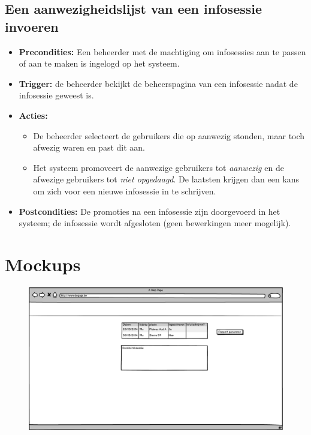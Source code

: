 \documentclass[11pt,a4paper,oneside]{article}
\begin{document}
\subsection{Een aanwezigheidslijst van een infosessie invoeren}
\begin{itemize}
\item \textbf{Precondities:} Een beheerder met de machtiging om infosessies aan te passen of aan te maken is ingelogd op het systeem.
\item \textbf{Trigger:} de beheerder bekijkt de beheerspagina van een infosessie nadat de infosessie geweest is.
\item \textbf{Acties:} 
\begin{itemize}
	\item	De beheerder selecteert de gebruikers die op aanwezig stonden, maar toch afwezig waren en past dit aan.
	\item	Het systeem promoveert de aanwezige gebruikers tot \emph{aanwezig} en de afwezige gebruikers tot \emph{niet opgedaagd}. De laatsten krijgen dan een kans om zich voor een nieuwe infosessie in te schrijven.
\end{itemize}
\item \textbf{Postcondities:} De promoties na een infosessie zijn doorgevoerd in het systeem; de infosessie wordt afgesloten (geen bewerkingen meer mogelijk).
\end{itemize}

\section{Mockups}

\begin{figure}[H]\includegraphics[width=\textwidth]{../../mockups/infosessies_autolener.png}\end{figure}
\end{document}
